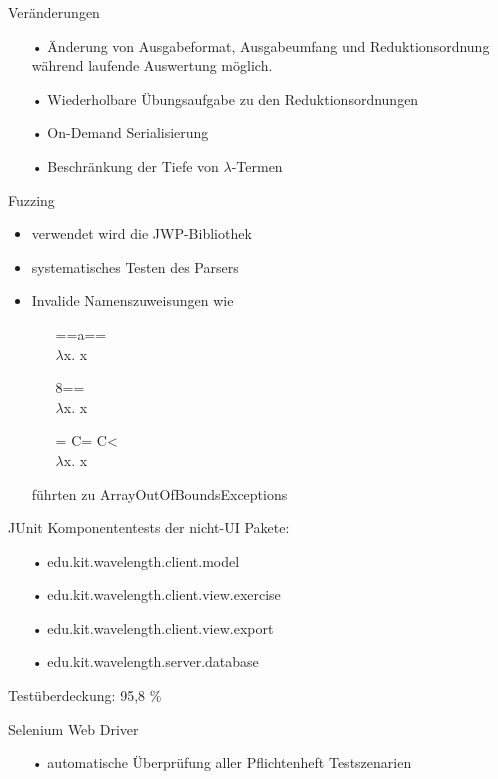 \documentclass[10pt]{beamer}
\begin{document}
\begin{frame}{Veränderungen}
\begin{itemize}
	\item[•] Änderung von Ausgabeformat, Ausgabeumfang und Reduktionsordnung während laufende Auswertung möglich.
	\item[•] Wiederholbare Übungsaufgabe zu den Reduktionsordnungen
	\item[•] On-Demand Serialisierung
	\item[•] Beschränkung der Tiefe von $\lambda$-Termen
\end{itemize}
\end{frame}

\begin{frame}{Fuzzing} %
\begin{itemize} 
	\item verwendet wird die JWP-Bibliothek
	\item systematisches Testen des Parsers
	\newline
	\item Invalide Namenszuweisungen wie
	\begin{multicols}{3}
	\begin{itemize}
		\item[] ==a== \\ $\lambda$x. x
		\item[] 8== \\ $\lambda$x. x
		\item[] = C= C< \\ $\lambda$x. x
	\end{itemize}
	\end{multicols}
	führten zu ArrayOutOfBoundsExceptions
\end{itemize}
\end{frame}

\begin{frame}{JUnit}
Komponententests der nicht-UI Pakete:
\begin{itemize}
	\item[•] edu.kit.wavelength.client.model
	\item[•] edu.kit.wavelength.client.view.exercise
	\item[•] edu.kit.wavelength.client.view.export
	\item[•] edu.kit.wavelength.server.database
\end{itemize}
Testüberdeckung: 95,8 \%
\end{frame}

\begin{frame}{Selenium Web Driver}
\begin{itemize}
	\item[•] automatische Überprüfung aller Pflichtenheft Testszenarien
\end{itemize}
\end{frame}
\end{document}

